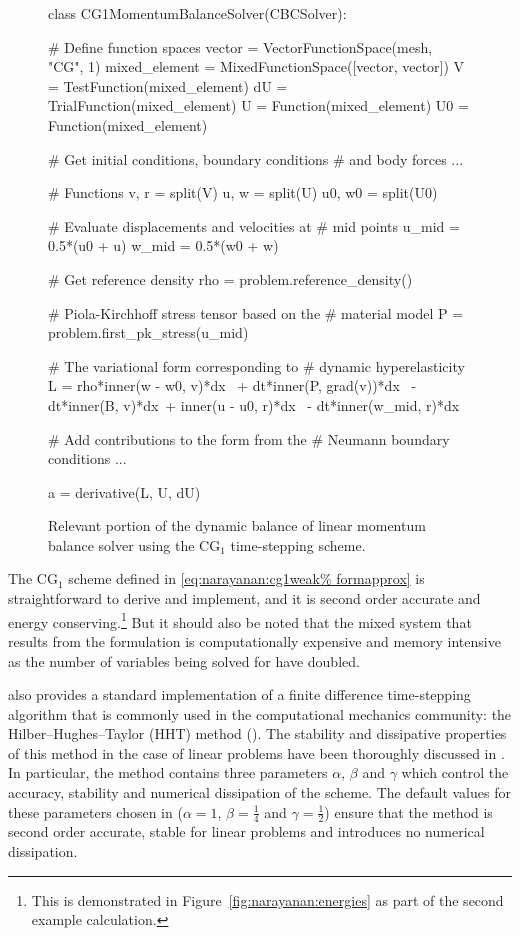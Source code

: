 \begin{figure}[ht]
\begin{python}
class CG1MomentumBalanceSolver(CBCSolver):

    # Define function spaces
    vector = VectorFunctionSpace(mesh, "CG", 1)
    mixed_element = MixedFunctionSpace([vector,
                                        vector])
    V = TestFunction(mixed_element)
    dU = TrialFunction(mixed_element)
    U = Function(mixed_element)
    U0 = Function(mixed_element)

    # Get initial conditions, boundary conditions
    # and body forces
    ...

    # Functions
    v, r = split(V)
    u, w = split(U)
    u0, w0 = split(U0)

    # Evaluate displacements and velocities at
    # mid points
    u_mid = 0.5*(u0 + u)
    w_mid = 0.5*(w0 + w)

    # Get reference density
    rho = problem.reference_density()

    # Piola-Kirchhoff stress tensor based on the
    # material model
    P = problem.first_pk_stress(u_mid)

    # The variational form corresponding to
    # dynamic hyperelasticity
    L = rho*inner(w - w0, v)*dx \
        + dt*inner(P, grad(v))*dx \
        - dt*inner(B, v)*dx\
        + inner(u - u0, r)*dx \
        - dt*inner(w_mid, r)*dx

    # Add contributions to the form from the
    # Neumann boundary conditions
    ...

    a = derivative(L, U, dU)
\end{python}
\caption{Relevant portion of the dynamic balance of linear momentum
  balance solver using the CG$_{1}$ time-stepping scheme.}
\label{code:narayanan:cg1}
\end{figure}

The CG$_{1}$ scheme defined in \eqref{eq:narayanan:cg1weak%
formapprox} is straightforward to derive and implement, and it is
second order accurate and energy conserving.\footnote{This is
  demonstrated in Figure~\ref{fig:narayanan:energies} as part of the
  second example calculation.}  But it should also be noted that the mixed
system that results from the formulation is computationally expensive
and memory intensive as the number of variables being solved for have
doubled.

\twist{} also provides a standard implementation of a finite
difference time-stepping algorithm that is commonly used in the
computational mechanics community: the Hilber--Hughes--Taylor (HHT)
method (\cite{HilberHughesTaylor1977}). The stability and dissipative
properties of this method in the case of linear problems have been
thoroughly discussed in \cite{Hughes1987}. In particular, the method
contains three parameters $\alpha$, $\beta$ and $\gamma$ which control
the accuracy, stability and numerical dissipation of the scheme. The
default values for these parameters chosen in \twist{} ($\alpha = 1$,
$\beta = \frac{1}{4}$ and $\gamma = \frac{1}{2}$) ensure that the
method is second order accurate, stable for linear problems and
introduces no numerical dissipation.

